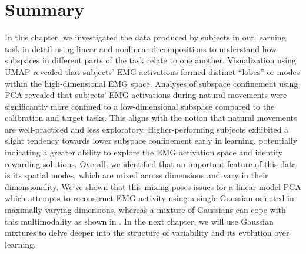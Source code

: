 \documentclass[../main.tex]{subfiles}
\begin{document}


\section{Summary}

In this chapter, we investigated the data produced by subjects in our learning task in detail using linear and nonlinear decompositions to understand how subspaces in different parts of the task relate to one another. Visualization using UMAP revealed that subjects' EMG activations formed distinct ``lobes'' or modes within the high-dimensional EMG space. Analyses of subspace confinement using PCA revealed that subjects' EMG activations during natural movements were significantly more confined to a low-dimensional subspace compared to the calibration and target tasks. This aligns with the notion that natural movements are well-practiced and less exploratory. Higher-performing subjects exhibited a slight tendency towards lower subspace confinement early in learning, potentially indicating a greater ability to explore the EMG activation space and identify rewarding solutions. Overall, we identified that an important feature of this data is its spatial modes, which are mixed across dimensions and vary in their dimensionality. We've shown that this mixing poses issues for a linear model PCA which attempts to reconstruct EMG activity using a single Gaussian oriented in maximally varying dimensions, whereas a mixture of Gaussians can cope with this multimodality as shown in . In the next chapter, we will use Gaussian mixtures to delve deeper into the structure of variability and its evolution over learning.

\cleardoublepage\printendnotes%
\ifSubfilesClassLoaded{%
    \newpage%
}{}%
\end{document}
